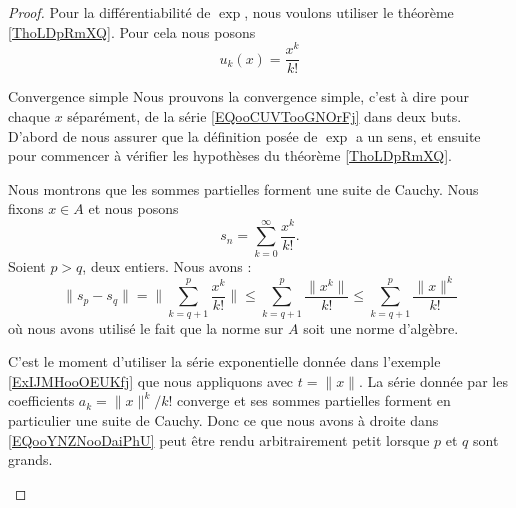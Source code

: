 \begin{proof}
    Pour la différentiabilité de \( \exp\), nous voulons utiliser le théorème \ref{ThoLDpRmXQ}. Pour cela nous posons
    \begin{equation}
        u_k(x)=\frac{ x^k }{ k! }
    \end{equation}

    \begin{subproof}
        \item[Convergence simple]
            Nous prouvons la convergence simple, c'est à dire pour chaque \( x\) séparément, de la série \eqref{EQooCUVTooGNOrFj} dans deux buts. D'abord de nous assurer que la définition posée de \( \exp\) a un sens, et ensuite pour commencer à vérifier les hypothèses du théorème \ref{ThoLDpRmXQ}.

            Nous montrons que les sommes partielles forment une suite de Cauchy. Nous fixons \( x\in A\) et nous posons
            \begin{equation}
                s_n=\sum_{k=0}^{\infty}\frac{ x^k }{ k! }.
            \end{equation}
            Soient \( p>q\), deux entiers. Nous avons :
            \begin{equation}        \label{EQooYNZNooDaiPhU}
                \| s_p-s_q \|=\| \sum_{k=q+1}^p\frac{ x^k }{ k! } \|\leq \sum_{k=q+1}^p\frac{ \| x^k \| }{ k! }\leq \sum_{k=q+1}^p\frac{ \| x \|^k }{ k! }
            \end{equation}
            où nous avons utilisé le fait que la norme sur \( A\) soit une norme d'algèbre.

            C'est le moment d'utiliser la série exponentielle donnée dans l'exemple \ref{ExIJMHooOEUKfj} que nous appliquons avec \( t=\| x \|\). La série donnée par les coefficients \( a_k=\| x \|^k/k!\) converge et ses sommes partielles forment en particulier une suite de Cauchy. Donc ce que nous avons à droite dans \eqref{EQooYNZNooDaiPhU} peut être rendu arbitrairement petit lorsque \( p\) et \( q\) sont grands.


\end{subproof}
\end{proof}
